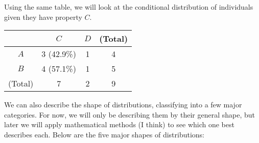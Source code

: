 \begin{example}
    Using the same table, we will look at the conditional distribution of individuals given they have property \( C \).

    \begin{center}
        \begin{tabular}{c|c|c|c}
            & \( C \) & \( D \) & (Total) \\
            \hline \( A \) & \cellcolor{ForestGreen!20} 3 (42.9\%) & 1 & 4 \\
            \hline \( B \) & \cellcolor{ForestGreen!20} 4 (57.1\%) & 1 & 5 \\
            \hline (Total) & 7 & 2 & 9
        \end{tabular}
    \end{center}
\end{example}

We can also describe the shape of distributions, classifying into a few major categories. For now, we will only be describing them by their general shape, but later we will apply mathematical methods (I think) to see which one best describes each. Below are the five major shapes of distributions:

